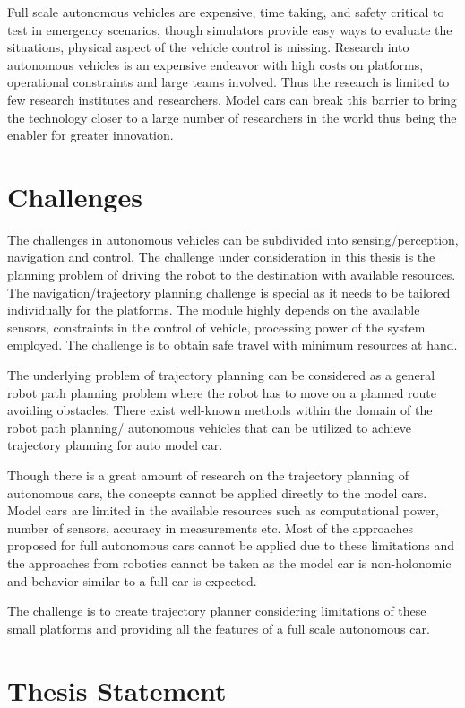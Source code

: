 Full scale autonomous vehicles are expensive, time taking, and safety critical to test in emergency scenarios, though simulators provide easy ways to evaluate the situations, physical aspect of the vehicle control is missing. Research into autonomous vehicles is an expensive endeavor with high costs on platforms, operational constraints and large teams involved. Thus the research is limited to few research institutes and researchers. Model cars can break this barrier to bring the technology closer to a large number of researchers in the world thus being the enabler for greater innovation. 

\section{Challenges}

The challenges in autonomous vehicles can be subdivided into sensing/perception, navigation and control. The challenge under consideration in this thesis is the planning problem of driving the robot to the destination with available resources. The navigation/trajectory planning challenge is special as it needs to be tailored individually for the platforms. The module highly depends on the available sensors, constraints in the control of vehicle, processing power of the system employed.  The challenge is to obtain safe travel with minimum resources at hand. 

The underlying problem of trajectory planning can be considered as a general robot path planning problem where the robot has to move on a planned route avoiding obstacles. There exist well-known methods within the domain of the robot path planning/ autonomous vehicles that can be utilized to achieve trajectory planning for auto model car. 

Though there is a great amount of research on the trajectory planning of autonomous cars, the concepts cannot be applied directly to the model cars. Model cars are limited in the available resources such as computational power, number of sensors, accuracy in measurements etc. Most of the approaches proposed for full autonomous cars cannot be applied due to these limitations and the approaches from robotics cannot be taken as the model car is non-holonomic and behavior similar to a full car is expected. 

The challenge is to create trajectory planner considering limitations of these small platforms and providing all the features of a full scale autonomous car. 

\section{Thesis Statement}

